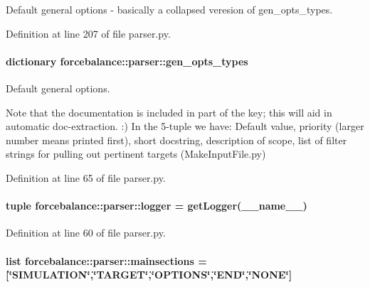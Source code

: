 \-Default general options -\/ basically a collapsed veresion of gen\-\_\-opts\-\_\-types. 



\-Definition at line 207 of file parser.\-py.

\hypertarget{namespaceforcebalance_1_1parser_a2ac3b892432d1c614c32eebeb8de41c5}{
\paragraph[{gen\-\_\-opts\-\_\-types}]{\setlength{\rightskip}{0pt plus 5cm}dictionary {\bf forcebalance\-::parser\-::gen\-\_\-opts\-\_\-types}}}\label{namespaceforcebalance_1_1parser_a2ac3b892432d1c614c32eebeb8de41c5}


\-Default general options. 

\-Note that the documentation is included in part of the key; this will aid in automatic doc-\/extraction. \-:) \-In the 5-\/tuple we have\-: \-Default value, priority (larger number means printed first), short docstring, description of scope, list of filter strings for pulling out pertinent targets (\-Make\-Input\-File.\-py) 

\-Definition at line 65 of file parser.\-py.

\hypertarget{namespaceforcebalance_1_1parser_a0e0761161c5ff444c7afbcc9157cd710}{
\paragraph[{logger}]{\setlength{\rightskip}{0pt plus 5cm}tuple {\bf forcebalance\-::parser\-::logger} = get\-Logger(\-\_\-\-\_\-name\-\_\-\-\_\-)}}\label{namespaceforcebalance_1_1parser_a0e0761161c5ff444c7afbcc9157cd710}


\-Definition at line 60 of file parser.\-py.

\hypertarget{namespaceforcebalance_1_1parser_a525ac339b645dbfb9fbb7cc672712504}{
\paragraph[{mainsections}]{\setlength{\rightskip}{0pt plus 5cm}list {\bf forcebalance\-::parser\-::mainsections} = \mbox{[}\char`\"{}\-S\-I\-M\-U\-L\-A\-T\-I\-O\-N\char`\"{},\char`\"{}\-T\-A\-R\-G\-E\-T\char`\"{},\char`\"{}\-O\-P\-T\-I\-O\-N\-S\char`\"{},\char`\"{}\-E\-N\-D\char`\"{},\char`\"{}\-N\-O\-N\-E\char`\"{}\mbox{]}}}\label{namespaceforcebalance_1_1parser_a525ac339b645dbfb9fbb7cc672712504}


